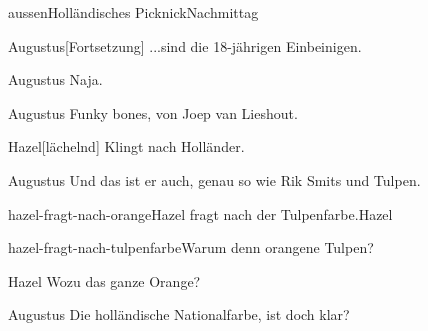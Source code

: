 \documentclass[12pt]{article}
\begin{document}
\begin{scene}{aussen}{Holländisches Picknick}{Nachmittag}

        \begin{dialog}{Augustus}[Fortsetzung]
            ...sind die 18-jährigen Einbeinigen.
        \end{dialog}


        \begin{dialog}{Augustus}
            Naja.
        \end{dialog}


        \begin{dialog}{Augustus}
            Funky bones, von Joep van Lieshout.
        \end{dialog}

        \begin{dialog}{Hazel}[lächelnd]
            Klingt nach Holländer.
        \end{dialog}

        \begin{dialog}{Augustus}
            Und das ist er auch, genau so wie Rik Smits und Tulpen.
        \end{dialog}


        \begin{decision}{hazel-fragt-nach-orange}{\gls{Hazel} fragt nach der Tulpenfarbe.}{Hazel}
            \begin{option}{hazel-fragt-nach-tulpenfarbe}{Warum denn orangene Tulpen?}
                \begin{dialog}{Hazel}
                    Wozu das ganze Orange?
                \end{dialog}

                \begin{dialog}{Augustus}
                    Die holländische Nationalfarbe, ist doch klar?
                \end{dialog}
            \end{option}


\end{decision}
\end{scene}
\end{document}
